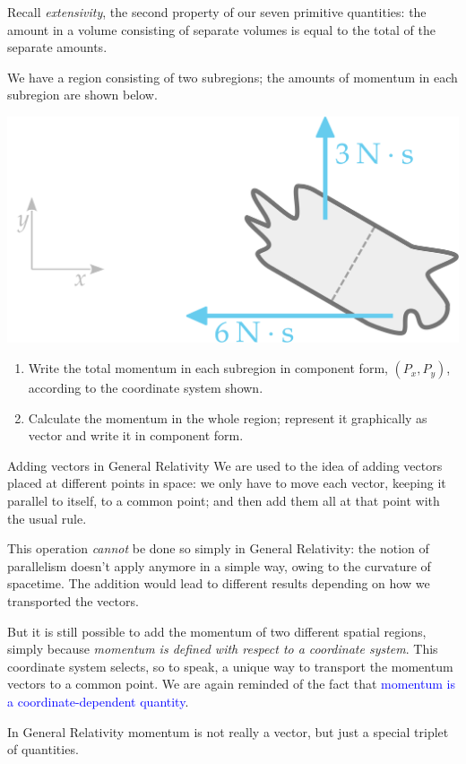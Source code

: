 \documentclass[a4paper,12pt,%
onecolumn,oneside,%
british%
]{memoir}
\renewcommand*{\|}[1][]{\nonscript\:#1\vert\nonscript\:\mathopen{}}
\newcommand*{\sect}{\S}%
\renewcommand*{\autoref}[2]{\sidepar{\vspace{-1ex}\footnotesize{\color{blue}\faIcon{%
angle-right%
}\enskip\sect~\ref{#1} page~\pageref{#1}}}\textcolor{blue}{#2}}
\begin{document}
\bigskip


\begin{exercise}
  Recall \emph{extensivity}, the second property of our seven primitive quantities: the amount in a volume consisting of separate volumes is equal to the total of the separate amounts.

We have a region consisting of two subregions; the amounts of momentum in each subregion are shown below.
  \begin{center}
    \includegraphics[width=0.5\linewidth]{images/exercise_momentumsum.pdf}
  \end{center}
  \begin{enumerate}[exerc]
  \item Write the total momentum in each subregion in component form, $(P_{x}, P_{y})$, according to the coordinate system shown.
  \item Calculate the momentum in the whole region; represent it graphically as vector and write it in component form.
  \end{enumerate}
\end{exercise}

\begin{extra}{Adding vectors in General Relativity}
  We are used to the idea of adding vectors placed at different points in space: we only have to move each vector, keeping it parallel to itself, to a common point; and then add them all at that point with the usual rule.

  This operation \emph{cannot} be done so simply in General Relativity: the notion of parallelism doesn't apply anymore in a simple way, owing to the curvature of spacetime. The addition would lead to different results depending on how we transported the vectors.

  But it is still possible to add the momentum of two different spatial regions, simply because \emph{momentum is defined with respect to a coordinate system}. This coordinate system selects, so to speak, a unique way to transport the momentum vectors to a common point. We are again reminded of the fact that \autoref{sec:energy_momentum_angmomentum_coords}{momentum is a coordinate-dependent quantity}.

  In General Relativity momentum is not really a vector, but just a special triplet of quantities.

\end{extra}
\end{document}
